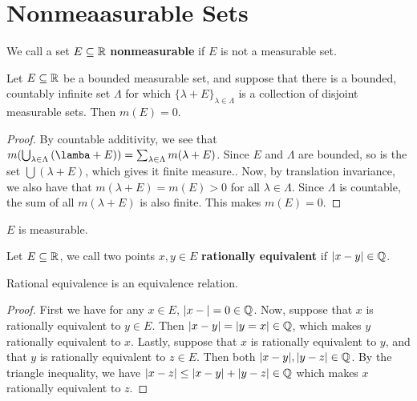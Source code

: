 
\section{Nonmeaasurable Sets}

\begin{definition}
    We call a set $E \subseteq \mathbb{R}$  \textbf{nonmeasurable} if $E$ is not a
    measurable set.
\end{definition}

\begin{lemma}\label{8.5.1}
    Let $E \subseteq \mathbb{R}$ be a bounded measurable set, and suppose that there is
    a bounded, countably infinite set  $\Lambda$ for which
    $\{\lambda+E\}_{\lambda \in  \Lambda}$ is a collection of disjoint
    measurable sets. Then $m(E)=0$.
\end{lemma}
\begin{proof}
    By countable additivity, we see that $m(\bigcup_{\lambda \in
    \Lambda}{(\lamba+E)})=\sum_{\lambda \in \Lambda}{m(\lambda+E)}$. Since $E$
    and $\Lambda$ are bounded, so is the set  $\bigcup{(\lambda+E)}$, which
    gives it finite measure.. Now, by translation invariance, we also have that
     $m(\lambda+E)=m(E)>0$ for all $\lambda \in \Lambda$. Since  $\Lambda$ is
     countable, the sum of all $m(\lambda+E)$ is also finite. This makes
     $m(E)=0$.
\end{proof}
\begin{corollary}
   $E$ is measurable.
\end{corollary}

\begin{definition}
    Let $E \subseteq \mathbb{R}$, we call two points  $x,y \in E$  \textbf{rationally
    equivalent} if $|x-y| \in \mathbb{Q}$.
\end{definition}

\begin{lemma}\label{8.5.2}
    Rational equivalence is an equivalence relation.
\end{lemma}
\begin{proof}
    First we have for any $x \in E$,  $|x-|=0 \in \mathbb{Q}$. Now, suppose that  $x$ is
    rationally equivalent to $y \in E$. Then $|x-y|=|y=x| \in \mathbb{Q}$, which makes
    $y$ rationally equivalent to $x$. Lastly, suppose that $x$ is rationally
    equivalent to $y$, and that $y$ is rationally equivalent to $z \in E$. Then
    both $|x-y|,|y-z| \in \mathbb{Q}$. By the triangle inequality, we have  $|x-z| \leq
    |x-y|+|y-z| \in \mathbb{Q}$ which makes  $x$ rationally equivalent to $z$.
\end{proof}

